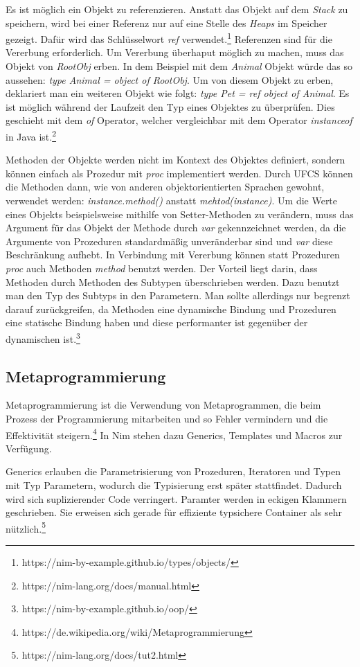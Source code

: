 \documentclass[11pt]{report}
\begin{document}
Es ist möglich ein Objekt zu referenzieren. Anstatt das Objekt auf dem \emph{Stack} zu speichern, wird bei einer Referenz nur auf eine Stelle des \emph{Heaps} im Speicher gezeigt. Dafür wird das Schlüsselwort \emph{ref} verwendet.\footnote{https://nim-by-example.github.io/types/objects/}
Referenzen sind für die Vererbung erforderlich. Um Vererbung überhaput möglich zu machen, muss das Objekt von \emph{RootObj} erben. In dem Beispiel mit dem \emph{Animal} Objekt würde das so aussehen: \emph{type Animal = object of RootObj}. Um von diesem Objekt zu erben, deklariert man ein weiteren Objekt wie folgt: \emph{type Pet = ref object of Animal}.
Es ist möglich während der Laufzeit den Typ eines Objektes zu überprüfen.
Dies geschieht mit dem \emph{of} Operator, welcher vergleichbar mit dem Operator \emph{instanceof} in Java ist.\footnote{https://nim-lang.org/docs/manual.html}

Methoden der Objekte werden nicht im Kontext des Objektes definiert, sondern können einfach als Prozedur mit \emph{proc} implementiert werden. Durch UFCS können die Methoden dann, wie von anderen objektorientierten Sprachen gewohnt, verwendet werden: \emph{instance.method()} anstatt \emph{mehtod(instance)}.
Um die Werte eines Objekts beispielsweise mithilfe von Setter-Methoden zu verändern, muss das Argument für das Objekt der Methode durch \emph{var} gekennzeichnet werden, da die Argumente von Prozeduren standardmäßig unveränderbar sind und \emph{var} diese Beschränkung aufhebt.
In Verbindung mit Vererbung können statt Prozeduren \emph{proc} auch Methoden \emph{method} benutzt werden. Der Vorteil liegt darin, dass Methoden durch Methoden des Subtypen überschrieben werden. Dazu benutzt man den Typ des Subtyps in den Parametern. Man sollte allerdings nur begrenzt darauf zurückgreifen, da Methoden eine dynamische Bindung und Prozeduren eine statische Bindung haben und diese performanter ist gegenüber der dynamischen ist.\footnote{https://nim-by-example.github.io/oop/}


\subsection{Metaprogrammierung}
Metaprogrammierung ist die Verwendung von Metaprogrammen, die beim Prozess der Programmierung mitarbeiten und so Fehler vermindern und die Effektivität steigern.\footnote{https://de.wikipedia.org/wiki/Metaprogrammierung} In Nim stehen dazu Generics, Templates und Macros zur Verfügung.

Generics erlauben die Parametrisierung von Prozeduren, Iteratoren und Typen mit Typ Parametern, wodurch die Typisierung erst später stattfindet. Dadurch wird sich suplizierender Code verringert. Paramter werden in eckigen Klammern geschrieben. Sie erweisen sich gerade für effiziente typsichere Container als sehr nützlich.\footnote{https://nim-lang.org/docs/tut2.html}
\end{document}
